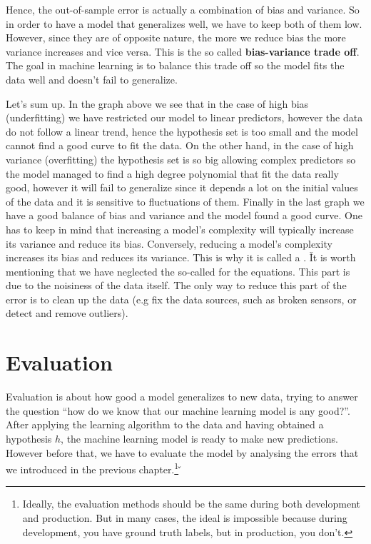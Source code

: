 Hence, the out-of-sample error is actually a combination of bias and variance. So in order to have a model that
generalizes well, we have to keep both of them low. However, since they are of opposite nature, the more we reduce
bias the more variance increases and vice versa. This is the so called \textbf{bias-variance trade off}. The goal in
machine learning is to balance this trade off so the model fits the data well and doesn't fail to generalize.


Let's sum up. In the graph above we see that in the case of high bias (underfitting) we have restricted our model to
linear predictors, however the data do not follow a linear trend, hence the hypothesis set is too small and the model
cannot find a good curve to fit the data. On the other hand, in the case of high variance (overfitting) the
hypothesis set is so big allowing complex predictors so the model managed to find a high degree polynomial that fit
the data really good, however it will fail to generalize since it depends a lot on the initial values of the data and
it is sensitive to fluctuations of them. Finally in the last graph we have a good balance of bias and variance and
the model found a good curve. One has to keep in mind that increasing a model's complexity will typically increase
its variance and reduce its bias. Conversely, reducing a model's complexity increases its bias and reduces its
variance. This is why it is called a . \v

It is worth mentioning that we have neglected the so-called  for the equations. This part is
due to the noisiness of the data itself. The only way to reduce this part of the error is to clean up the data (e.g
fix the data sources, such as broken sensors, or detect and remove outliers).

\section{Evaluation}

Evaluation is about how good a model generalizes to new data, trying to answer the question ``how do we know that our
machine learning model is any good?''. After applying the learning algorithm to the data and having obtained a
hypothesis $h$, the machine learning model is ready to make new predictions. However before that, we have to evaluate
the model by analysing the errors that we introduced in the previous chapter.\footnote{Ideally, the evaluation
methods should be the same during both development and production. But in many cases, the ideal is impossible because
during development, you have ground truth labels, but in production, you don't.} \v

